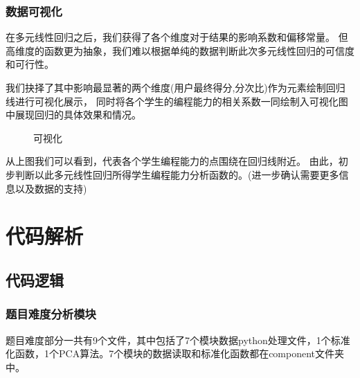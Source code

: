 \documentclass[UTF8]{ctexart}
\begin{document}
\subsubsection{数据可视化}
在多元线性回归之后，我们获得了各个维度对于结果的影响系数和偏移常量。
但高维度的函数更为抽象，我们难以根据单纯的数据判断此次多元线性回归的可信度和可行性。

我们抉择了其中影响最显著的两个维度(用户最终得分,分次比)作为元素绘制回归线进行可视化展示，
同时将各个学生的编程能力的相关系数一同绘制入可视化图中展现回归的具体效果和情况。

\begin{figure}[htb] 
\caption{\label{1} 可视化} 
\end{figure}

从上图我们可以看到，代表各个学生编程能力的点围绕在回归线附近。
由此，初步判断以此多元线性回归所得学生编程能力分析函数的。(进一步确认需要更多信息以及数据的支持)
\section{代码解析}
\subsection{代码逻辑}
\subsubsection{题目难度分析模块}
题目难度部分一共有9个文件，其中包括了7个模块数据python处理文件，1个标准化函数，1个PCA算法。7个模块的数据读取和标准化函数都在component文件夹中。
\end{document}
